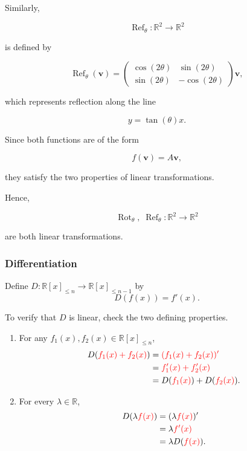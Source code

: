 \documentclass[12pt]{article}
\begin{document}
Similarly,

\[
\operatorname{Ref}_{\theta}:\mathbb{R}^2\rightarrow\mathbb{R}^2
\]

is defined by

\[
\operatorname{Ref}_{\theta}(\mathbf{v})
=
\begin{pmatrix}
\cos(2\theta) & \sin(2\theta)\\
\sin(2\theta) & -\cos(2\theta)
\end{pmatrix}
\mathbf{v},
\]

which represents reflection along the line

\[
y=\tan(\theta)x.
\]

Since both functions are of the form

\[
f(\mathbf{v})=A\mathbf{v},
\]

they satisfy the two properties of linear transformations.

Hence,

\[
\operatorname{Rot}_{\theta},\;
\operatorname{Ref}_{\theta}
:\mathbb{R}^2\rightarrow\mathbb{R}^2
\]

are both linear transformations.

\subsubsection{Differentiation}

Define $D:\mathbb{R}[x]_{\le n} \longrightarrow \mathbb{R}[x]_{\le n-1}$
by
\[
D(f(x))=f'(x).
\]

To verify that $D$ is linear, check the two defining properties.

\begin{enumerate}
    \item For any $f_1(x),f_2(x)\in\mathbb{R}[x]_{\le n}$,
    \[
    \begin{aligned}
    D(\textcolor{red}{f_1(x)+f_2(x)})
    &=\textcolor{red}{(f_1(x)+f_2(x))'} \\
    &=\textcolor{red}{f_1'(x)+f_2'(x)} \\
    &=D(\textcolor{red}{f_1(x)})+D(\textcolor{red}{f_2(x)}).
    \end{aligned}
    \]

    \item For every $\lambda\in\mathbb{R}$,
    \[
    \begin{aligned}
    D(\lambda \textcolor{red}{f(x)})
    &=(\lambda \textcolor{red}{f(x)})'\\
    &=\lambda \textcolor{red}{f'(x)}\\
    &=\lambda D(\textcolor{red}{f(x)}).
    \end{aligned}
    \]
\end{enumerate}
\end{document}
